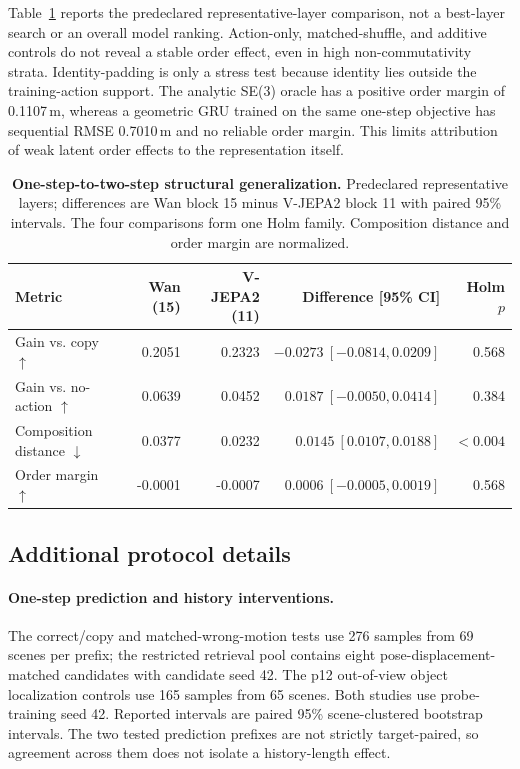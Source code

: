 \documentclass{article} %
\begin{document}
Table~\ref{tab:se3_representative} reports the predeclared representative-layer
comparison, not a best-layer search or an overall model ranking. Action-only,
matched-shuffle, and additive controls do not reveal a stable order effect,
even in high non-commutativity strata. Identity-padding is only a stress test
because identity lies outside the training-action support. The analytic
SE(3) oracle has a positive order margin of 0.1107\,m, whereas a geometric
GRU trained on the same one-step objective has sequential RMSE 0.7010\,m
and no reliable order margin. This limits attribution of weak latent order
effects to the representation itself.
\begin{table}[t]
  \centering
  \caption{\textbf{One-step-to-two-step structural generalization.}
  Predeclared representative layers; differences are Wan block 15 minus V-JEPA2
  block 11 with paired 95\% intervals. The four comparisons form one Holm family.
  Composition distance and order margin are normalized.}
  \label{tab:se3_representative}
  \footnotesize
  \setlength{\tabcolsep}{4pt}
  \begin{tabular}{@{}lrrrr@{}}
    \toprule
    Metric & Wan (15) & V-JEPA2 (11) & Difference [95\% CI] & Holm $p$ \\
    \midrule
    Gain vs. copy $\uparrow$ & 0.2051 & 0.2323 & $-0.0273\ [-0.0814,0.0209]$ & 0.568 \\
    Gain vs. no-action $\uparrow$ & 0.0639 & 0.0452 & $0.0187\ [-0.0050,0.0414]$ & 0.384 \\
    Composition distance $\downarrow$ & 0.0377 & 0.0232 & $0.0145\ [0.0107,0.0188]$ & $<0.004$ \\
    Order margin $\uparrow$ & -0.0001 & -0.0007 & $0.0006\ [-0.0005,0.0019]$ & 0.568 \\
    \bottomrule
  \end{tabular}
\end{table}


\subsection{Additional protocol details}
\label{sec:protocol-details}

\paragraph{One-step prediction and history interventions.}
The correct/copy and matched-wrong-motion tests use 276 samples from 69
scenes per prefix; the restricted retrieval pool contains eight
pose-displacement-matched candidates with candidate seed 42. The p12
out-of-view object localization controls use 165 samples from 65 scenes.
Both studies use probe-training seed 42. Reported intervals are paired
95\% scene-clustered bootstrap intervals. The two tested prediction
prefixes are not strictly target-paired, so agreement across them does
not isolate a history-length effect.
\end{document}
